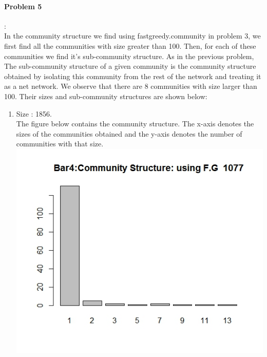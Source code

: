 \documentclass{article}
\begin{document}
\paragraph{Problem 5}:\\
In the community structure we find using fastgreedy.community in problem 3, we first find all the communities with 
size greater than 100. Then, for each of these communities we find it's sub-community structure. 
As in the previous problem, The sub-community structure of a given community is the community structure obtained
by isolating this community from the rest of the network and treating it as a net network.
We observe that there are 8 communities with size larger than 100. Their sizes and sub-community structures are shown below:\\
\begin{enumerate}
 \item 
 Size : 1856.\\
 The figure below contains the community structure. The x-axis denotes the sizes of the communities obtained
 and the y-axis denotes the number of communities with that size.\\
 \includegraphics[scale=0.4]{p8}


\end{enumerate}
\end{document}
